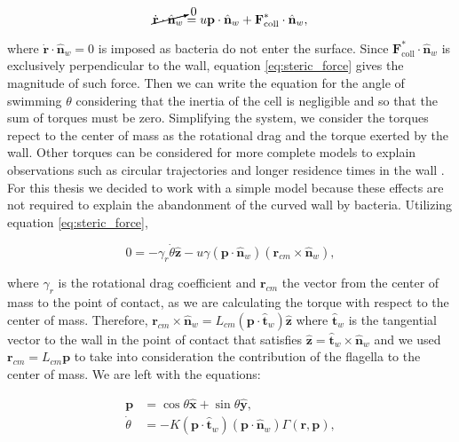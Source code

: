 \begin{equation} \label{eq:steric_force}
   \cancelto{0}{\dot{\textbf{r}} \cdot \hat{\textbf{n}}_w}  = u\textbf{p} \cdot \hat{\textbf{n}}_w + \textbf{F}^*_{\text{coll}} \cdot \hat{\textbf{n}}_w ,
\end{equation}

where $\dot{\textbf{r}} \cdot \hat{\textbf{n}}_w = 0$ is imposed as bacteria do not enter the surface. Since $\textbf{F}^*_{\text{coll}} \cdot \hat{\textbf{n}}_w $ is exclusively perpendicular to the wall, equation \eqref{eq:steric_force} gives the magnitude of such force. Then we can write the equation for the angle of swimming $\theta$ considering that the inertia of the cell is negligible and so that the sum of torques must be zero. Simplifying the system, we consider the torques repect to the center of mass as the rotational drag and the torque exerted by the wall. Other torques can be considered for more complete models to explain observations such as circular trajectories and longer residence times in the wall \cite{Lauga2006SwimmingBoundaries, Sipos2015HydrodynamicWalls}. For this thesis we decided to work with a simple model because these effects are not required to explain the abandonment of the curved wall by bacteria. Utilizing equation \eqref{eq:steric_force}, 

\begin{equation} \label{eq:deduction_of_K}
    0 = - \gamma_r \dot{\theta} \hat{\textbf{z}} - u \gamma (\textbf{p} \cdot \hat{\textbf{n}}_w) (\textbf{r}_{cm} \times \hat{\textbf{n}}_w),
\end{equation}

where $\gamma_r$ is the rotational drag coefficient and $\textbf{r}_{cm}$ the vector from the center of mass to the point of contact, as we are calculating the torque with respect to the center of mass. Therefore, $\textbf{r}_{cm} \times \hat{\textbf{n}}_w = L_{cm} (\textbf{p} \cdot \hat{\textbf{t}}_w) \hat{\textbf{z}}$ where $\hat{\textbf{t}}_w$ is the tangential vector to the wall in the point of contact that satisfies $\hat{\textbf{z}} = \hat{\textbf{t}}_w \times \hat{\textbf{n}}_w$  and we used $\textbf{r}_{cm} = L_{cm} \textbf{p} $ to take into consideration the contribution of the flagella to the center of mass. We are left with the equations:

\begin{align}
    \textbf{p} &= \cos{\theta}\hat{\textbf{x}}+\sin{\theta}\hat{\textbf{y}}, \\
    \dot{\theta} &= -K (\textbf{p} \cdot \hat{\textbf{t}}_w)  (\textbf{p} \cdot \hat{\textbf{n}}_w) \Gamma(\textbf{r}, \textbf{p}),
    \label{eq:wall alignment}
\end{align}


